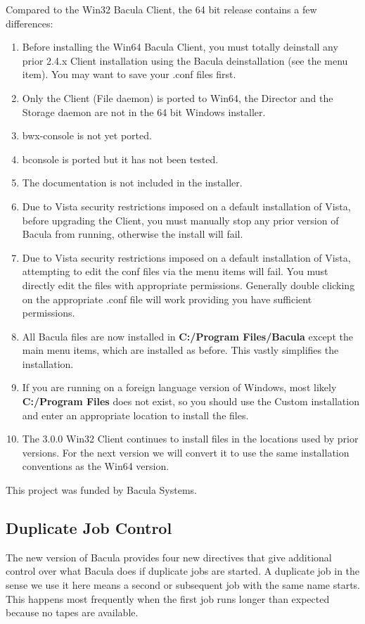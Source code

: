 Compared to the Win32 Bacula Client, the 64 bit release contains a few differences:
\begin{enumerate}
\item Before installing the Win64 Bacula Client, you must totally
      deinstall any prior 2.4.x Client installation using the 
      Bacula deinstallation (see the menu item). You may want
      to save your .conf files first.
\item Only the Client (File daemon) is ported to Win64, the Director
      and the Storage daemon are not in the 64 bit Windows installer.
\item bwx-console is not yet ported.
\item bconsole is ported but it has not been tested.
\item The documentation is not included in the installer.
\item Due to Vista security restrictions imposed on a default installation
      of Vista, before upgrading the Client, you must manually stop
      any prior version of Bacula from running, otherwise the install
      will fail.
\item Due to Vista security restrictions imposed on a default installation
      of Vista, attempting to edit the conf files via the menu items
      will fail. You must directly edit the files with appropriate 
      permissions.  Generally double clicking on the appropriate .conf
      file will work providing you have sufficient permissions.
\item All Bacula files are now installed in 
      {\bf C:/Program Files/Bacula} except the main menu items,
      which are installed as before. This vastly simplifies the installation.
\item If you are running on a foreign language version of Windows, most
      likely {\bf C:/Program Files} does not exist, so you should use the
      Custom installation and enter an appropriate location to install
      the files.
\item The 3.0.0 Win32 Client continues to install files in the locations used
      by prior versions. For the next version we will convert it to use
      the same installation conventions as the Win64 version.
\end{enumerate}

This project was funded by Bacula Systems.


\subsection{Duplicate Job Control}
The new version of Bacula provides four new directives that
give additional control over what Bacula does if duplicate jobs 
are started.  A duplicate job in the sense we use it here means
a second or subsequent job with the same name starts.  This
happens most frequently when the first job runs longer than expected because no 
tapes are available.

